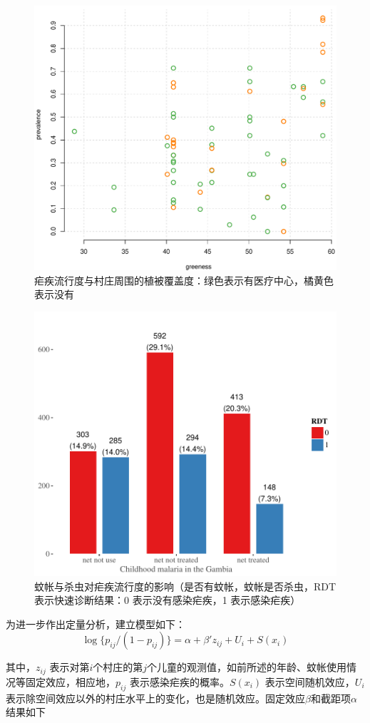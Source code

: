 \documentclass[hyperref, a4paper, UTF8, zihao = -4, linespread = 1.25, scheme = chinese]{ctexbook}
\begin{document}
\begin{figure}

{\centering \includegraphics[width=0.6\linewidth]{figures/gambia-prevalence} 

}

\caption{疟疾流行度与村庄周围的植被覆盖度：绿色表示有医疗中心，橘黄色表示没有}\label{fig:gambia-prevalence}
\end{figure}
\begin{figure}

{\centering \includegraphics[width=0.6\linewidth]{figures/gambia-bed-net} 

}

\caption{蚊帐与杀虫对疟疾流行度的影响（是否有蚊帐，蚊帐是否杀虫，RDT 表示快速诊断结果：0 表示没有感染疟疾，1 表示感染疟疾）}\label{fig:bed-net}
\end{figure}

\newpage

为进一步作出定量分析，建立模型如下：\begin{equation}
\log\{p_{ij}/(1-p_{ij})\} = \alpha + \beta'z_{ij} + U_{i} + S(x_{i}) \label{eq:SGPSM-gambia}
\end{equation}

其中，\(z_{ij}\)
表示对第\(i\)个村庄的第\(j\)个儿童的观测值，如前所述的年龄、蚊帐使用情况等固定效应，相应地，\(p_{ij}\)
表示感染疟疾的概率。\(S(x_{i})\) 表示空间随机效应，\(U_{i}\)
表示除空间效应以外的村庄水平上的变化，也是随机效应。固定效应\(\beta\)和截距项\(\alpha\)结果如下
\end{document}
